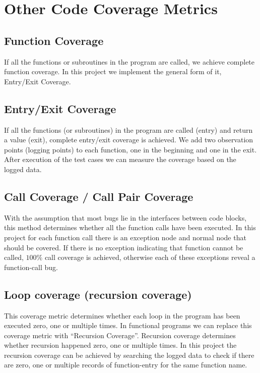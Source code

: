 \documentclass[12pt,a4paper]{report}
\begin{document}
\section{Other Code Coverage Metrics}

\subsection{Function Coverage}
If all the functions or subroutines in the program are called, we achieve complete function coverage.
In this project we implement the general form of it, Entry/Exit Coverage.

\subsection{Entry/Exit Coverage}
If all the functions (or subroutines) in the program are called (entry) and return a value (exit), complete entry/exit coverage is achieved.
We add two observation points (logging points) to each function, one in the beginning and one in the exit. After execution of the test cases we can measure the coverage based on the logged data. 

\subsection{Call Coverage / Call Pair Coverage}
With the assumption that most bugs lie in the interfaces between code blocks, this method determines whether all the function calls have been executed.
In this project for each function call there is an exception node and normal node that should be covered. If there is no exception indicating that function cannot be called, $100\%$ call coverage is achieved, otherwise each of these exceptions reveal a function-call bug.

\subsection{Loop coverage (recursion coverage)}
This coverage metric determines whether each loop in the program has been executed zero, one or multiple times. In functional programs we can replace this coverage metric with ``Recursion Coverage''. Recursion coverage determines whether recursion happened zero, one or multiple times. In this project the recursion coverage can be achieved by searching the logged data to check if there are zero, one or multiple records of function-entry for the same function name.
\end{document}
